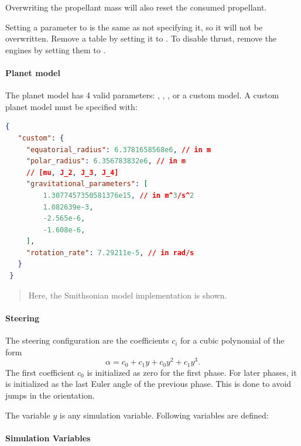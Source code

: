 Overwriting the propellant mass will also reset the consumed propellant.

Setting a parameter to  is the same as not specifying it, so it will not be overwritten.
Remove a table by setting it to . To disable thrust, remove
the engines by setting them to \json{[]}.

\paragraph{Planet model}

The planet model has 4 valid parameters:
, , , or a custom model. A custom planet model must be
specified with:

\begin{lstlisting}[language=json]
 {
   "custom": {
     "equatorial_radius": 6.3781658568e6, // in m
     "polar_radius": 6.356783832e6, // in m
     // [mu, J_2, J_3, J_4]
     "gravitational_parameters": [
         1.3077457350581376e15, // in m^3/s^2
         1.082639e-3,
         -2.565e-6,
         -1.608e-6,
     ],
     "rotation_rate": 7.29211e-5, // in rad/s
   }
 }
\end{lstlisting}

\begin{quote} Here, the Smithsonian model implementation is shown.
\end{quote}

\paragraph{Steering}

The steering configuration are the coefficients \(c_i\) for a cubic
polynomial of the form \[
  \alpha = c_0 + c_1y + c_0y^2 + c_1y^3.
\] The first coefficient \(c_0\) is initialized as zero for the first
phase. For later phases, it is initialized as the last Euler angle of
the previous phase. This is done to avoid jumps in the orientation.

The variable \(y\) is any simulation variable. Following variables are
defined:

\paragraph{Simulation Variables}

